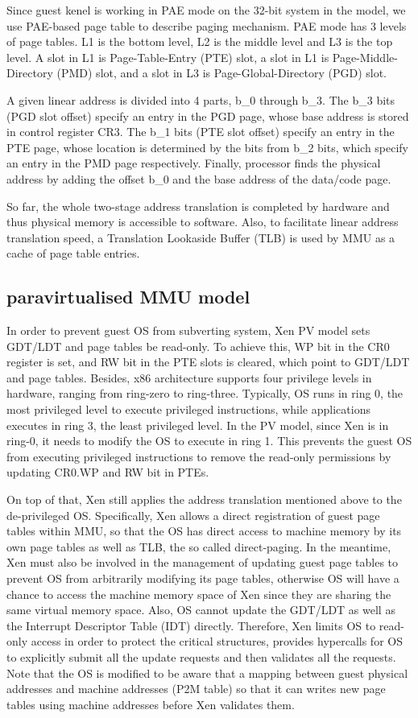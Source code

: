 Since guest kenel is working in PAE mode on the 32-bit system in the model, we use PAE-based page table to describe paging mechanism. PAE mode has 3 levels of page tables. L1 is the bottom level, L2 is the middle level and L3 is the top level. A slot in L1 is Page-Table-Entry (PTE) slot, a slot in L1 is Page-Middle-Directory (PMD) slot, and a slot in L3 is Page-Global-Directory (PGD) slot.

A given linear address is divided into 4 parts, b\_0 through b\_3. The b\_3 bits (PGD slot offset) specify an entry in the PGD page, whose base address is stored in control register CR3. The b\_1 bits (PTE slot offset) specify an entry in the PTE page, whose location is determined by the bits from b\_2 bits, which specify an entry in the PMD page respectively. Finally, processor finds the physical address by adding the offset b\_0 and the base address of the data/code page.

So far, the whole two-stage address translation is completed by hardware and thus physical memory is accessible to software. Also, to facilitate linear address translation speed, a Translation Lookaside Buffer (TLB) is used by MMU as a cache of page table entries.

\subsection{paravirtualised MMU model}

In order to prevent guest OS from subverting system, Xen PV model sets GDT/LDT and page tables be read-only. To achieve this, WP bit in the CR0 register is set, and RW bit in the PTE slots is cleared, which point to GDT/LDT and page tables. Besides, x86 architecture supports four privilege levels in hardware, ranging from ring-zero to ring-three. Typically, OS runs in ring 0, the most privileged level to execute privileged instructions, while applications executes in ring 3, the least privileged level. In the PV model, since Xen is in ring-0, it needs to modify the OS to execute in ring 1. This prevents the guest OS from executing privileged instructions to remove the read-only permissions by updating CR0.WP and RW bit in PTEs.

On top of that, Xen still applies the address translation mentioned above to the de-privileged OS. Specifically, Xen allows a direct registration of guest page tables within MMU, so that the OS has direct access to machine memory by its own page tables as well as TLB, the so called direct-paging. In the meantime, Xen must also be involved in the management of updating guest page tables to prevent OS from arbitrarily modifying its page tables, otherwise OS will have a chance to access the machine memory space of Xen since they are sharing the same virtual memory space. Also, OS cannot update the GDT/LDT as well as the Interrupt Descriptor Table (IDT) directly. Therefore, Xen limits OS to read-only access in order to protect the critical structures, provides hypercalls for OS to explicitly submit all the update requests and then validates all the requests. Note that the OS is modified to be aware that a mapping between guest physical addresses and machine addresses (P2M table) so that it can writes new page tables using machine addresses before Xen validates them.

